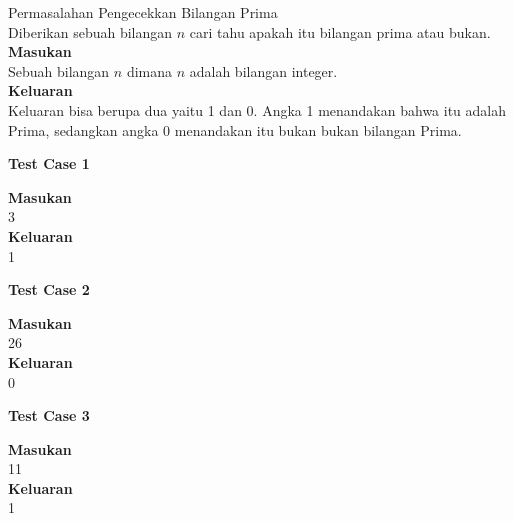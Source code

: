 \newpage
\begin{permasalahan}{Permasalahan Pengecekkan Bilangan Prima}\\
	Diberikan sebuah bilangan $n$ cari tahu apakah itu bilangan prima atau bukan.\\
	\textbf{Masukan}\\
	Sebuah bilangan $n$ dimana $n$ adalah bilangan integer.\\
	\textbf{Keluaran}\\
	Keluaran bisa berupa dua yaitu 1 dan 0. Angka 1 menandakan bahwa itu adalah Prima, sedangkan angka 0 menandakan itu bukan bukan bilangan Prima.\\
	\begin{center}
	\textbf{Test Case 1}\\
	\end{center}
	\textbf{Masukan}\\
	3\\
	\textbf{Keluaran}\\
	1\\
	
	\begin{center}
	\textbf{Test Case 2}\\
	\end{center}
	\textbf{Masukan}\\
	26\\
	\textbf{Keluaran}\\
	0\\
	
	\begin{center}
	\textbf{Test Case 3}\\
	\end{center}
	\textbf{Masukan}\\
	11\\
	\textbf{Keluaran}\\
	1\\
	
\end{permasalahan}

